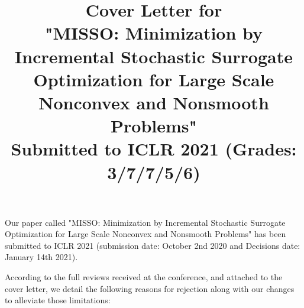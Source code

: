 \documentclass{article}
\begin{document}
\title{Cover Letter for\\
"MISSO: Minimization by Incremental Stochastic Surrogate Optimization for Large Scale Nonconvex and Nonsmooth Problems"\\
Submitted to \textbf{ICLR 2021} (Grades: 3/7/7/5/6)}


\date{}
\maketitle


Our paper called "MISSO: Minimization by Incremental Stochastic Surrogate Optimization for Large Scale Nonconvex and Nonsmooth Problems" has been submitted to ICLR 2021 (submission date: October 2nd 2020 and Decisions date: January 14th 2021).

According to the full reviews received at the conference, and attached to the cover letter, we detail the following reasons for rejection along with our changes to alleviate those limitations:
\end{document}
